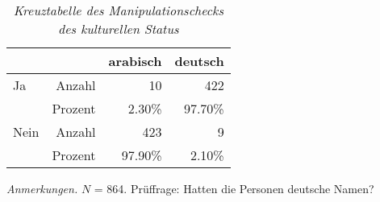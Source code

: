 \begin{table}[htb]
    \caption[Kreuztabelle Manipulationscheck kultureller Status]{\textit {Kreuztabelle des Manipulationschecks des kulturellen Status}} 
    \label{KT_kult}
    \centering
    \begin{adjustbox}{width=\textwidth}
    \small
    \begin{tabular}{lrrr}
      \hline
        &   & arabisch & deutsch \\
      \hline
    Ja   & Anzahl  & 10      & 422      \\
         & Prozent & 2.30\%  & 97.70\%  \\
    Nein & Anzahl  & 423     & 9        \\
         & Prozent & 97.90\% & 2.10\%   \\
       \hline
    \end{tabular}
    \end{adjustbox}
    
    \begin{tablenotes}
        \item \textit{Anmerkungen.} \( N \) = 864. Prüffrage: Hatten die Personen deutsche Namen?
      \end{tablenotes}
    \end{table}